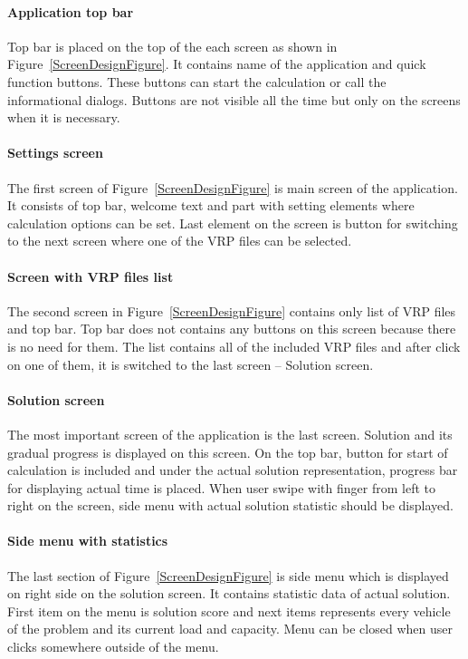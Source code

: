 \paragraph{Application top bar}
Top bar is placed on the top of the each screen as shown in Figure~\ref{ScreenDesignFigure}. It contains name of the
application and quick function buttons. These buttons can start the calculation or call the informational dialogs.
Buttons are not visible all the time but only on the screens when it is necessary.

\paragraph{Settings screen}
The first screen of Figure~\ref{ScreenDesignFigure} is main screen of the application. It consists of top bar, welcome
text and part with setting elements where calculation options can be set. Last element on the screen is button for
switching to the next screen where one of the VRP files can be selected.

\paragraph{Screen with VRP files list}
The second screen in Figure~\ref{ScreenDesignFigure} contains only list of VRP files and top bar. Top bar does not
contains any buttons on this screen because there is no need for them. The list contains all of the included VRP files
and after click on one of them, it is switched to the last screen -- Solution screen.

\paragraph{Solution screen}
The most important screen of the application is the last screen. Solution and its gradual progress is displayed on this
screen. On the top bar, button for start of calculation is included and under the actual solution representation,
progress bar for displaying actual time is placed. When user swipe with finger from left to right on the screen, side
menu with actual solution statistic should be displayed.

\paragraph{Side menu with statistics}
The last section of Figure~\ref{ScreenDesignFigure} is side menu which is displayed on right side on the solution
screen. It contains statistic data of actual solution. First item on the menu is solution score and next items
represents every vehicle of the problem and its current load and capacity. Menu can be closed when user clicks somewhere
outside of the menu.

